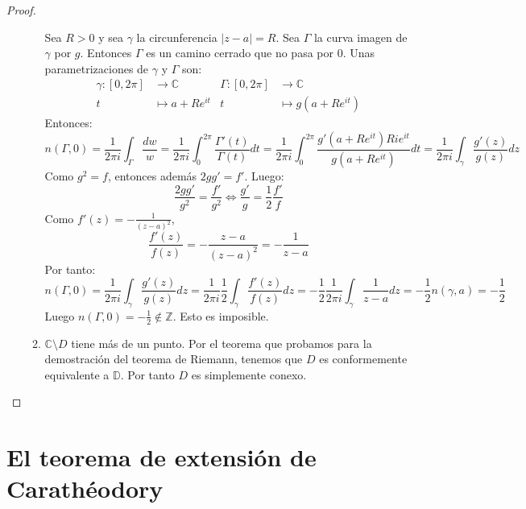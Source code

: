 \begin{proof}
\begin{itemize}
\begin{enumerate}
                      Sea $R > 0$ y sea $\gamma$ la circunferencia $|z-a| = R$.
                      Sea $\Gamma$ la curva imagen de $\gamma$ por $g$.
                      Entonces $\Gamma$ es un camino cerrado que no pasa por 0.
                      Unas parametrizaciones de $\gamma$ y $\Gamma$ son:
                      \begin{align*}
                          \gamma: [0, 2\pi] & \to \mathbb{C}      & \Gamma: [0, 2\pi] & \to \mathbb{C}         \\
                          t                 & \mapsto a + Re^{it} & t                 & \mapsto g(a + Re^{it})
                      \end{align*}
                      Entonces:
                      $$n(\Gamma, 0) = \frac{1}{2\pi i} \int_\Gamma \frac{dw}{w} = \frac{1}{2\pi i} \int_0^{2\pi} \frac{\Gamma'(t)}{\Gamma(t)}dt = \frac{1}{2\pi i} \int_0^{2\pi} \frac{g'(a + Re^{it})Rie^{it}}{g(a + Re^{it})}dt = \frac{1}{2\pi i} \int_\gamma \frac{g'(z)}{g(z)}dz$$
                      Como $g^2 = f$, entonces además $2gg' = f'$.
                      Luego:
                      $$\frac{2gg'}{g^2} = \frac{f'}{g^2} \Leftrightarrow \frac{g'}{g} = \frac{1}{2}\frac{f'}{f}$$
                      Como $f'(z) = -\frac{1}{(z-a)^2}$,
                      $$\frac{f'(z)}{f(z)} = -\frac{z-a}{(z-a)^2} = -\frac{1}{z-a}$$
                      Por tanto:
                      $$n(\Gamma, 0) = \frac{1}{2\pi i} \int_\gamma \frac{g'(z)}{g(z)}dz = \frac{1}{2\pi i}\frac{1}{2} \int_\gamma \frac{f'(z)}{f(z)}dz = -\frac{1}{2}\frac{1}{2\pi i} \int_\gamma \frac{1}{z-a}dz = -\frac{1}{2}n(\gamma, a) = -\frac{1}{2}$$
                      Luego $n(\Gamma, 0) = -\frac{1}{2} \notin \mathbb{Z}$.
                      Esto es imposible.

                \item $\mathbb{C} \setminus D$ tiene más de un punto.
                      Por el teorema que probamos para la demostración del teorema de Riemann, tenemos que $D$ es conformemente equivalente a $\mathbb{D}$.
                      Por tanto $D$ es simplemente conexo.
            \end{enumerate}
    \end{itemize}
\end{proof}

\section{El teorema de extensión de Carathéodory}


